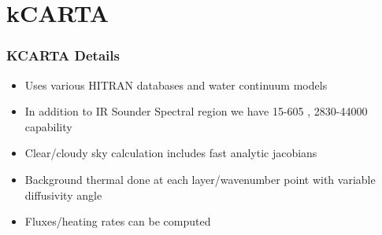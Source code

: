 \documentclass[10pt,t]{beamer}
\begin{document}
\section{kCARTA}
\begin{frame}
  \frametitle{KCARTA Details}
  \begin{itemize}
  \item Uses various HITRAN databases and water continuum models
  \item In addition to IR Sounder Spectral region we have 15-605 \wn, 2830-44000 \wn capability
  \item Clear/cloudy sky calculation includes fast analytic jacobians
  \item Background thermal done at each layer/wavenumber point with
    variable diffusivity angle
  \item Fluxes/heating rates can be computed
  \end{itemize}
\end{frame}
\end{document}
